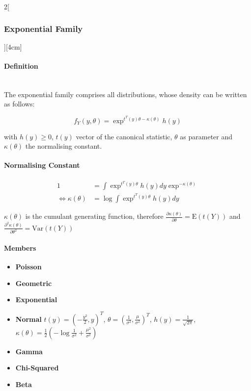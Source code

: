 \documentclass[8pt]{extarticle}
\begin{document}
\begin{multicols}{2}[\subsubsection{Exponential Family}][4cm]

  \paragraph{Definition} \ \\
  \noindent The exponential family comprises all distributions, whose density can be written as follows:
  
  $$f_Y(y,\theta) = \exp^{t^T(y)\theta - \kappa (\theta)}h(y)$$
  
  with $h(y) \geq 0$, $t(y)$ vector of the canonical statistic, $\theta$ as parameter and $\kappa (\theta)$ the normalising constant.
  
  \paragraph{Normalising Constant}
  
  \begin{align*}
  1 &= \int \exp^{t^T(y)\theta}h(y)dy \exp^{ - \kappa (\theta)} \\
  \Leftrightarrow \kappa (\theta) &= \log \int \exp^{t^T(y)\theta}h(y)dy
  \end{align*}
  
  \noindent $\kappa (\theta)$ is the cumulant generating function, therefore $\frac{\partial\kappa(\theta)}{\partial\theta} = \mathrm{E}(t(Y))$ and $\frac{\partial^2\kappa(\theta)}{\partial\theta^2} = \mathrm{Var}(t(Y))$
  
  
  
  \paragraph{Members}
  
  \begin{itemize}
  \item \textbf{Poisson}
  \item \textbf{Geometric}
  \item \textbf{Exponential}
  \item \textbf{Normal}
   $t(y) = \left(-\frac{y^2}{2},y \right)^T$,  
   $\theta = \left(\frac{1}{\sigma^2}, \frac{\mu}{\sigma^2}\right)^T$,
   $h(y) = \frac{1}{\sqrt{2\pi}}$,
   $\kappa ( \theta ) = \frac{1}{2} \left( -\log \frac{1}{\sigma^2} + \frac{\mu^2}{\sigma^2} \right)$
  \item \textbf{Gamma}
  \item \textbf{Chi-Squared}
  \item \textbf{Beta}
  \end{itemize}
  


\end{multicols}
\end{document}
